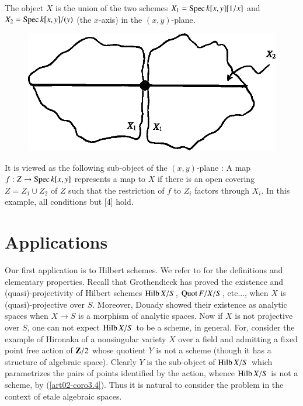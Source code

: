 \begin{example}\label{art02-exam5.11}
The object $X$ is the union of the two schemes $X_{1}=\operatorname{\mathrm{Spec}} k[x,y][1/x]$ and $X_{2}=\operatorname{\mathrm{Spec}} k[x,y]/(y)$ (the $x$-axis) in the $(x,y)$-plane.
\begin{figure}[H]
\centering
\includegraphics{figure/fig5.eps}
\end{figure}
It is viewed as the following sub-object of the $(x,y)$-plane : A map $f:Z\to \operatorname{\mathrm{Spec}} k[x,y]$ represents a map to $X$ if there is an open covering $Z=Z_{1}\cup Z_{2}$ of $Z$ such that the restriction of $f$ to $Z_{i}$ factors through $X_{i}$. In this example, all conditions but [4] hold.
\end{example}

\section{Applications}\label{art02-sec6}
\pageoriginale

Our first application is to Hilbert schemes. We refer to \cite{art02-key12} for the definitions and elementary properties. Recall that Grothendieck \cite{art02-key12} has proved the existence and (quasi)-projectivity of Hilbert schemes $\operatorname{\mathrm{Hilb}} X/S$, $\operatorname{\mathrm{Quot}} F/X/S$, etc..., when $X$ is (quasi)-projective over $S$. Moreover, Douady \cite{art02-key9} showed their existence as analytic spaces when $X\to S$ is a morphism of analytic spaces. Now if $X$ is not projective over $S$, one can not expect $\operatorname{\mathrm{Hilb}} X/S$ to be a scheme, in general. For, consider the example of Hironaka \cite{art02-key16} of a nonsingular variety $X$ over a field and admitting a fixed point free action of $\mathbf{Z}/2$ whose quotient $Y$ is not a scheme (though it has a structure of algebraic space). Clearly $Y$ is the sub-object of $\operatorname{\mathrm{Hilb}} X/S$ which parametrizes the pairs of points identified by the action, whence $\operatorname{\mathrm{Hilb}} X/S$ is not a scheme, by (\ref{art02-coro3.4}). Thus it is natural to consider the problem in the context of etale algebraic spaces.

